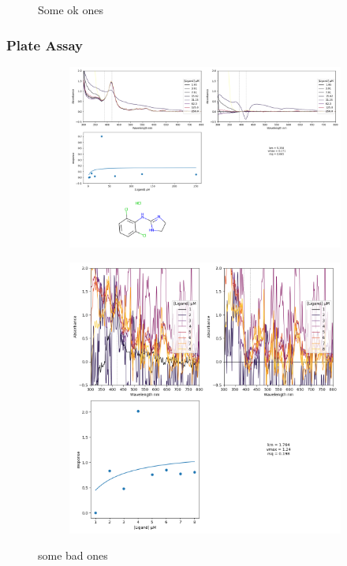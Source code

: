 \documentclass[10pt]{beamer}
\begin{document}
\begin{frame}
\begin{figure}
\begin{subfigure}{0.49\linewidth}
	\end{subfigure}
		\caption{\label{ok-ones} Some ok ones}
	\end{figure}
\end{frame}

\begin{frame}
	\frametitle{\textbf{Plate Assay }}
	\begin{figure}
	\begin{subfigure}{0.49\linewidth} 
	\includegraphics[width=\textwidth]{figs/32.png}
	\end{subfigure}
	\begin{subfigure}{0.49\linewidth} 
	\includegraphics[width=\textwidth]{figs/bad-trace.png}
	\end{subfigure}
		\caption{\label{bad-ones} some bad ones}
	\end{figure}
\end{frame}
\end{document}
